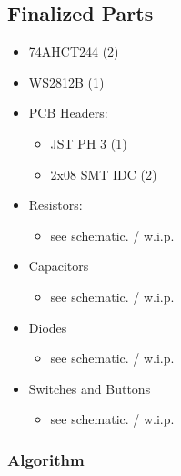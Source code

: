 \subsection{Finalized Parts}
\begin{itemize}
    \item 74AHCT244 (2)
    \item WS2812B (1)
    \item PCB Headers:
    \begin{itemize}
        \item JST PH 3 (1)
        \item 2x08 SMT IDC (2)
    \end{itemize}
    \item Resistors:
    \begin{itemize}
        \item see schematic. / w.i.p.
    \end{itemize}
    \item Capacitors
    \begin{itemize}
        \item see schematic. / w.i.p.
    \end{itemize}
    \item Diodes 
    \begin{itemize}
        \item see schematic. / w.i.p.
    \end{itemize}
    \item Switches and Buttons
    \begin{itemize}
        \item see schematic. / w.i.p.
    \end{itemize}
\end{itemize}
\subsubsection{Algorithm}

